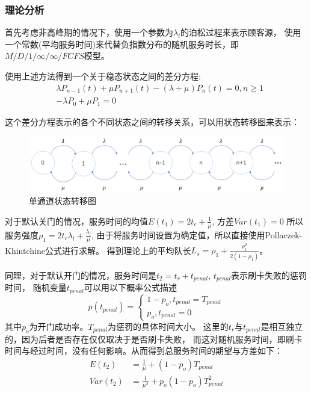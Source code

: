 \subsubsection{理论分析}
首先考虑非高峰期的情况下，使用一个参数为$\lambda_{l}$的泊松过程来表示顾客源，
使用一个常数(平均服务时间)来代替负指数分布的随机服务时长，即$M/D/1/\infty/\infty/FCFS$模型。

使用上述方法得到一个关于稳态状态之间的差分方程:
\begin{equation}
    \begin{aligned}
        & \lambda P_{n-1}(t)+\mu P_{n+1}(t)-(\lambda+\mu )P_n(t)=0,n\geq 1 \\
        & -\lambda P_{0}+\mu P_{1}=0
    \end{aligned}
\end{equation}

这个差分方程表示的各个不同状态之间的转移关系，可以用状态转移图来表示：
\begin{figure}[ht]    
    \centering
    \includegraphics[width=.7\textwidth]{images/transform1.PNG}
    \caption{单通道状态转移图}
    \label{fig:transform1}
\end{figure}
\par 对于默认关门的情况，服务时间的均值$E(t_1)=2t_c+\frac{1}{\mu}$,
方差$Var(t_1)=0$
所以服务强度$\rho_1=2t_c\lambda_l+\frac{\lambda_l}{\mu}$,
由于将服务时间设置为确定值，所以直接使用Pollaczek-Khintchine公式进行求解。
得到理论上的平均队长$L_s=\rho_1+\frac{\rho_1^2}{2(1-\rho_1)}$。
\par 同理，对于默认开门的情况，服务时间是$t_2=t_r+t_{penal}$,
$t_{penal}$表示刷卡失败的惩罚时间，
随机变量$t_{penal}$可以用以下概率公式描述
\begin{equation}
    p(t_{penal})=
    \begin{cases}
        1-p_o,t_{penal}=T_{penal} \\
        p_o,t_{penal}=0
    \end{cases}
\end{equation}
其中$p_o$为开门成功率。$T_{penal}$为惩罚的具体时间大小。
这里的$t_r$与$t_{penal}$是相互独立的，因为后者是否存在仅仅取决于是否刷卡失败，
而这对随机服务时间，即刷卡时间与经过时间，没有任何影响。从而得到总服务时间的期望与方差如下：
\begin{equation}
    \begin{aligned}
        E(t_2) &=\frac{1}{\mu}+(1-p_o)T_{penal} \\
        Var(t_2)&=\frac{1}{\mu^2}+p_o(1-p_o)T_{penal}^2
    \end{aligned}
\end{equation}

